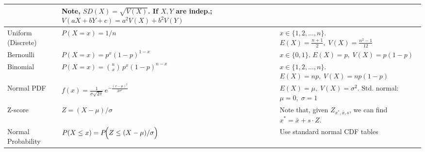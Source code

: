 \documentclass[letterpage]{article}
\begin{document}
\begin{table}[ht!]
\begin{tabular}{|p{}|p{}|p{}|}
& Note, $SD(X)=\sqrt{V(X)}$. If $X,Y$ are indep.; $V(aX+bY+c)=a^2V(X)+b^2V(Y)$ \\
\hline
Uniform (Discrete)
& $\displaystyle P(X = x) = 1/n$
& $x \in \{1,2,\ldots,n\}$. $ E(X) = \frac{n+1}{2},\;
   V(X) = \frac{n^2 - 1}{12}$  \\
\hline
Bernoulli
& $\displaystyle P(X = x) = p^x (1-p)^{1-x} $
& $x\in\{0,1\}$. $ E(X) = p,\;
   V(X) = p(1-p)$  \\
\hline
Binomial
& $\displaystyle P(X = x) = \binom{n}{x}\,p^x(1-p)^{n-x}$
&  $x \in \{1,2,\ldots,n\}$. $E(X)=np,\;V(X)=np(1-p)$ \\
\hline
Normal PDF
& $\displaystyle f(x) = \frac{1}{\sigma\sqrt{2\pi}}\,
   e^{-\frac{(x-\mu)^2}{2\sigma^2}}$
& $E(X)=\mu,\;V(X)=\sigma^2$. Std. normal: $\mu=0,\;\sigma=1$ \\
\hline
Z-score
& $\displaystyle Z = (X - \mu)/\sigma$
& Note that, given $Z_{x^*,\bar{x},s}$, we can find $x^*= \bar{x}+s\cdot Z$. \\
\hline
Normal Probability
& $\displaystyle P(X \le x)
   = P\!\Bigl(Z \le (X - \mu)/\sigma \Bigr)$
& Use standard normal CDF tables \\
\hline
\end{tabular}
\end{table}
\end{document}
